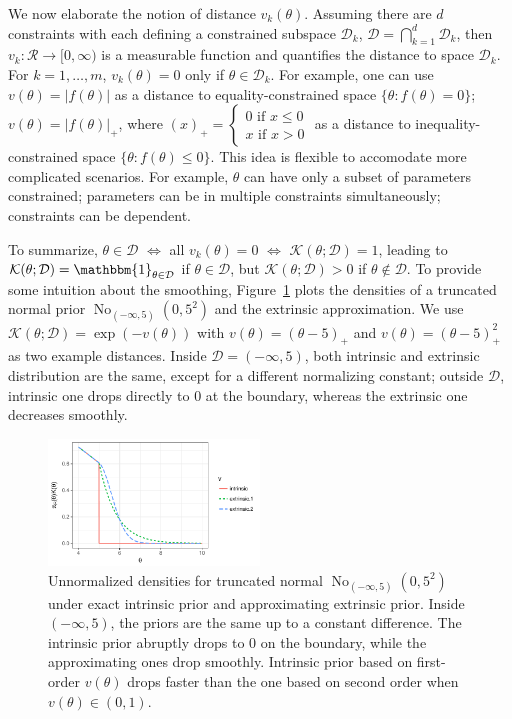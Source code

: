 \documentclass[10pt]{article}
\newcommand{\mc}[1]{\mathcal{#1}}
\DeclareMathOperator{\No}{No}
\DeclareMathOperator{\1}{\mathbbm{1}}
\begin{document}
We now elaborate the notion of distance $v_k(\theta)$. Assuming there are $d$ constraints with each defining a constrained subspace $\mc D_k$, $\mc D = \bigcap_{k=1}^d\mc D_k$, then $v_k: \mc R \rightarrow [0,\infty)$ is a measurable function and quantifies the distance to space $\mc D_k$. For $k=1,\ldots,m$, $v_k(\theta)=0$ only if $\theta\in \mc D_k$. For example, one can use $v(\theta)=|f(\theta)|$ as a distance to equality-constrained space  $\{\theta:f(\theta)=0\}$; $v(\theta)=|f(\theta)|_+$, where $(x)_+ = \left\{\begin{array}{cc}  0 \text{ if } x\le 0 \\ x \text{ if } x> 0\end{array}\right.$ as a distance to inequality-constrained space  $\{\theta:f(\theta) \le 0\}$. This idea is flexible to accomodate more complicated scenarios. For example, $\theta$ can have only a subset of parameters constrained; parameters can be in multiple constraints simultaneously; constraints can be dependent. 

To summarize, $\theta\in \mc D$ $\Leftrightarrow$ all $v_k(\theta)=0$ $\Leftrightarrow$ $\mc K(\theta; \mc D)=1$, leading to $\mc K(\theta; \mc D)=\mathbbm{1}_{\theta\in \mc D}$ if $\theta\in \mc D$, but $\mc K(\theta; \mc D)>0$ if  $\theta\not\in \mc D$. To provide some intuition about the smoothing, Figure~\ref{truncated_normal} plots the densities of a truncated normal prior $\No_{(-\infty,5)}(0,5^2)$ and the extrinsic approximation. We use $\mc K(\theta;\mc D)=\exp(-v(\theta))$ with $v(\theta)=(\theta-5)_+$ and $v(\theta)=(\theta-5)^2_+$ as two example distances. Inside $\mc D=(-\infty,5)$, both intrinsic and extrinsic distribution are the same, except for a different normalizing constant; outside $\mc D$, intrinsic one drops directly to $0$ at the boundary, whereas the extrinsic one decreases smoothly.

\begin{figure}[H]
 \centering
 \includegraphics[width=0.5\textwidth]{density_truncated_normal}
\caption{Unnormalized densities for truncated normal $\No_{(-\infty,5)}(0,5^2)$ under exact intrinsic prior and approximating extrinsic prior. Inside $(-\infty,5)$, the priors are the same up to a constant difference. The intrinsic prior abruptly drops to $0$ on the boundary, while the approximating ones drop smoothly. Intrinsic prior based on first-order $v(\theta)$ drops faster than the one based on second order when $v(\theta)\in (0,1)$.}
\label{truncated_normal}
\end{figure}
\end{document}
